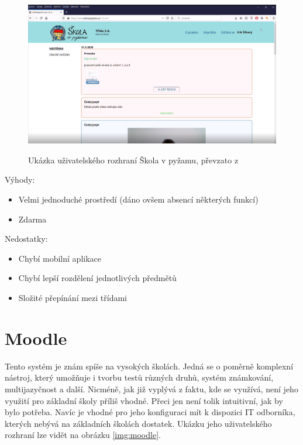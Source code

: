 \begin{figure}[H]
    \caption{Ukázka uživatelského rozhraní Škola v pyžamu, převzato z \cite{skola_v_pyzamu}}
    \centering
    \includegraphics[width=\textwidth]{images/skola_v_pyzamu}
    \label{img:skola_v_pyzamu}
\end{figure}

Výhody:
\begin{itemize}
  \item Velmi jednoduché prostředí (dáno ovšem absencí některých funkcí)
  \item Zdarma
\end{itemize}

Nedostatky:
\begin{itemize}
  \item Chybí mobilní aplikace
  \item Chybí lepší rozdělení jednotlivých předmětů
  \item Složité přepínání mezi třídami
\end{itemize}


\section{Moodle}

Tento systém je znám spíše na vysokých školách. Jedná se o poměrně komplexní nástroj, který umožňuje i tvorbu testů různých druhů, systém známkování, multijazyčnost a další. Nicméně, jak již vyplývá z faktu, kde se využívá, není jeho využití pro základní školy příliš vhodné. Přeci jen není tolik intuitivní, jak by bylo potřeba. Navíc je vhodné pro jeho konfiguraci mít k dispozici IT odborníka, kterých nebývá na základních školách dostatek. Ukázku jeho uživatelského rozhraní lze vidět na obrázku \ref{img:moodle}.

